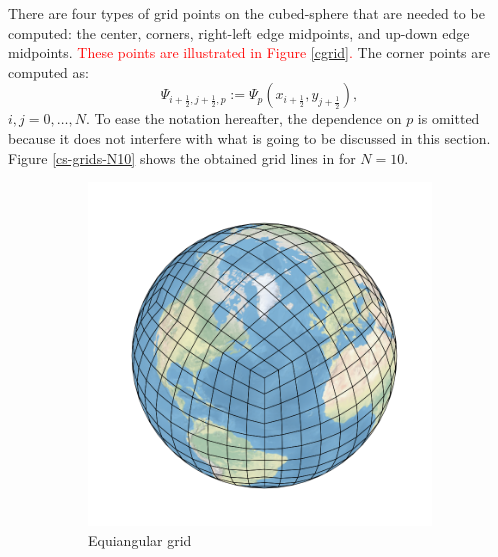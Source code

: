 \documentclass[preprint,12pt]{elsarticle}
\begin{document}
\begin{linenumbers}
There are four types of grid points on the cubed-sphere that are needed to be computed: the center, corners, right-left edge midpoints, and  up-down edge midpoints. 
\textcolor{red}
{These points are illustrated in Figure \ref{cgrid}.}
The corner points are computed as:
\begin{equation}
	\label{corner-points}
	\Psi_{i+\frac{1}{2},j+\frac{1}{2},p} := {\Psi}_p(x_{i+\frac{1}{2}},y_{j+\frac{1}{2}}),
\end{equation}
$i,j=0, \ldots, N$.
To ease the notation hereafter, the dependence on $p$ is omitted because it does not interfere with what is going to be discussed in this section.
Figure \ref{cs-grids-N10} shows the obtained grid lines in for $N=10$.
\begin{figure}[!htb]
	\begin{subfigure}{0.42\textwidth}
		\centering
		\includegraphics[width=1.1\linewidth]{gnomonic_equiedge_cs_10_sphere}
		\caption{Equiangular grid}
	\end{subfigure}
	\centering
\begin{subfigure}{0.42\textwidth}
	\centering

\end{subfigure}
\end{figure}
\end{linenumbers}
\end{document}
